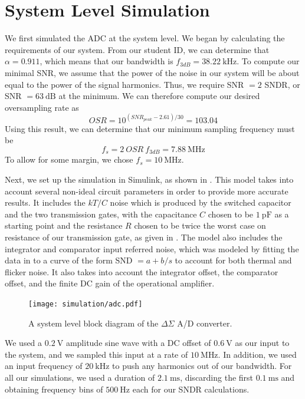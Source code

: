 \documentclass[journal,hidelinks]{IEEEtran}
\begin{document}
\section{System Level Simulation}

We first simulated the ADC at the system level. We began by calculating the requirements of our system. From our student ID, we can determine that $\alpha = 0.911$, which means that our bandwidth is $f_{3dB} = \SI{38.22}{\kilo\hertz}$. To compute our minimal SNR, we assume that the power of the noise in our system will be about equal to the power of the signal harmonics. Thus, we require SNR $= 2$ SNDR, or SNR $= \SI{63}{\deci\bel}$ at the minimum. We can therefore compute our desired oversampling rate as
\[ OSR = 10^{(SNR_{peak} - 2.61)/30} = 103.04 \]
Using this result, we can determine that our minimum sampling frequency must be
\[ f_s = 2 \  OSR \  f_{3dB} = \SI{7.88}{\mega\hertz} \]
To allow for some margin, we chose $f_s = \SI{10}{\mega\hertz}$.

Next, we set up the simulation in Simulink, as shown in . This model takes into account several non-ideal circuit parameters in order to provide more accurate results. It includes the $kT/C$ noise which is produced by the switched capacitor and the two transmission gates, with the capacitance $C$ chosen to be $\SI{1}{\pico\farad}$ as a starting point and the resistance $R$ chosen to be twice the worst case on resistance of our transmission gate, as given in . The model also includes the integrator and comparator input referred noise, which was modeled by fitting the data in  to a curve of the form SND $= a + b / s$ to account for both thermal and flicker noise. It also takes into account the integrator offset, the comparator offset, and the finite DC gain of the operational amplifier.

\begin{figure}[!htb]
  \centering
  \texttt{[image: simulation/adc.pdf]}
  \caption{A system level block diagram of the $\Delta \Sigma$ A/D converter.}
  \label{fig:sim_diagram}
\end{figure}

We used a $\SI{0.2}{\volt}$ amplitude sine wave with a DC offset of $\SI{0.6}{\volt}$ as our input to the system, and we sampled this input at a rate of $\SI{10}{\mega\hertz}$. In addition, we used an input frequency of $\SI{20}{\kilo\hertz}$ to push any harmonics out of our bandwidth. For all our simulations, we used a duration of $\SI{2.1}{\milli\second}$, discarding the first $\SI{0.1}{\milli\second}$ and obtaining frequency bins of $\SI{500}{\hertz}$ each for our SNDR calculations.
\end{document}

